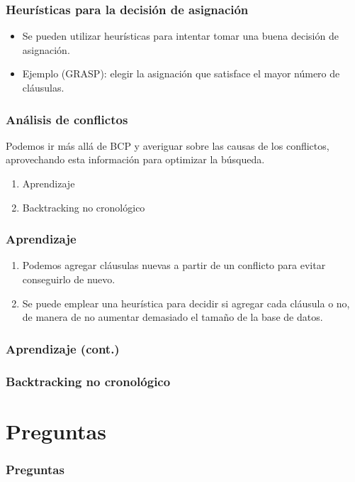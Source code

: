 \documentclass{beamer}
\begin{document}
\frame
{
  \frametitle{Heurísticas para la decisión de asignación}

  \begin{itemize}
   \item Se pueden utilizar heurísticas para intentar tomar una buena decisión de asignación.
   \item Ejemplo (GRASP): elegir la asignación que satisface el mayor número de cláusulas.
  \end{itemize}
}

\frame
{
  \frametitle{Análisis de conflictos}

  Podemos ir más allá de BCP y averiguar sobre las causas de los conflictos,
  aprovechando esta información para optimizar la búsqueda.

  \begin{enumerate}
   \item Aprendizaje
   \item Backtracking no cronológico
  \end{enumerate}

}

\frame
{
  \frametitle{Aprendizaje}

   \begin{enumerate}
    \item Podemos agregar cláusulas nuevas a partir de un conflicto para evitar conseguirlo de nuevo.
    \item Se puede emplear una heurística para decidir si agregar cada cláusula o no, de manera de no
          aumentar demasiado el tamaño de la base de datos.
   \end{enumerate}
}

\frame
{
  \frametitle{Aprendizaje (cont.)}

}

\frame
{
  \frametitle{Backtracking no cronológico}
}

\section{Preguntas}

\frame
{
  \frametitle{Preguntas}
}
\end{document}
